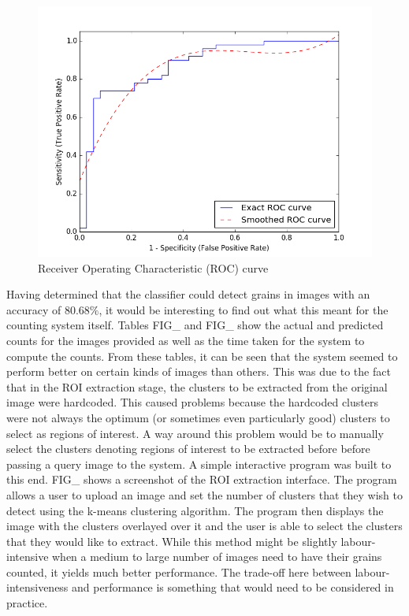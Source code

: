 \begin{figure}[ht!]
\centering
\includegraphics[scale=0.5]{Images/roc.png}
\caption{Receiver Operating Characteristic (ROC) curve}
\label{fig1}
\end{figure}
%
Having determined that the classifier could detect grains in images with an accuracy of $80.68\%$, it would be interesting to find out what this meant for the counting system itself. Tables FIG\_ and FIG\_ show the actual and predicted counts for the images provided as well as the time taken for the system to compute the counts. From these tables, it can be seen that the system seemed to perform better on certain kinds of images than others. This was due to the fact that in the ROI extraction stage, the clusters to be extracted from the original image were hardcoded. This caused problems because the hardcoded clusters were not always the optimum (or sometimes even particularly good) clusters to select as regions of interest. A way around this problem would be to manually select the clusters denoting regions of interest to be extracted before before passing a query image to the system. A simple interactive program was built to this end. FIG\_ shows a screenshot of the ROI extraction interface. The program allows a user to upload an image and set the number of clusters that they wish to detect using the k-means clustering algorithm. The program then displays the image with the clusters overlayed over it and the user is able to select the clusters that they would like to extract. While this method might be slightly labour-intensive when a medium to large number of images need to have their grains counted, it yields much better performance. The trade-off here between labour-intensiveness and performance is something that would need to be considered in practice.
